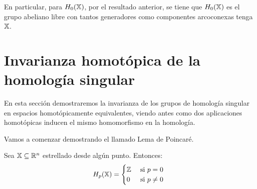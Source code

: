 En particular, para $H_0({\mathbb X})$, por el resultado anterior, se tiene que $H_0({\mathbb X})$ es el grupo abeliano libre con tantos generadores como
componentes arcoconexas tenga ${\mathbb X}$.

\section{Invarianza homotópica de la homología singular}

En esta sección demostraremos la invarianza de los grupos de homología singular en espacios homotópicamente equivalentes, viendo antes como
dos aplicaciones homotópicas inducen el mismo homomorfismo en la homología.

Vamos a comenzar demostrando el llamado Lema de Poincaré.

\begin{lemma}
  Sea ${\mathbb X} \subseteq \mathbb{R}^n$ estrellado desde algún punto. Entonces:
  \[ H_p({\mathbb X}) = \begin{cases}  \mathbb{Z} & \text{ si } p = 0 \\
                              0  & \text{ si } p \neq 0
                            \end{cases} \]
\end{lemma}

